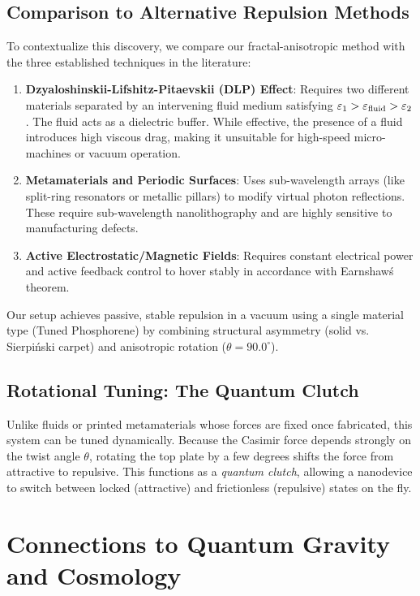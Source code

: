\documentclass[12pt,letterpaper]{article}
\begin{document}
\subsection{Comparison to Alternative Repulsion Methods}
To contextualize this discovery, we compare our fractal-anisotropic method with the three established techniques in the literature:
\begin{enumerate}
    \item \textbf{Dzyaloshinskii-Lifshitz-Pitaevskii (DLP) Effect}: Requires two different materials separated by an intervening fluid medium satisfying $\varepsilon_1 > \varepsilon_{\rm fluid} > \varepsilon_2$. The fluid acts as a dielectric buffer. While effective, the presence of a fluid introduces high viscous drag, making it unsuitable for high-speed micro-machines or vacuum operation.
    \item \textbf{Metamaterials and Periodic Surfaces}: Uses sub-wavelength arrays (like split-ring resonators or metallic pillars) to modify virtual photon reflections. These require sub-wavelength nanolithography and are highly sensitive to manufacturing defects.
    \item \textbf{Active Electrostatic/Magnetic Fields}: Requires constant electrical power and active feedback control to hover stably in accordance with Earnshaw\'s theorem.
\end{enumerate}
Our setup achieves passive, stable repulsion in a vacuum using a single material type (Tuned Phosphorene) by combining structural asymmetry (solid vs. Sierpi\'nski carpet) and anisotropic rotation ($\theta = 90.0^\circ$).

\subsection{Rotational Tuning: The Quantum Clutch}
Unlike fluids or printed metamaterials whose forces are fixed once fabricated, this system can be tuned dynamically. Because the Casimir force depends strongly on the twist angle $\theta$, rotating the top plate by a few degrees shifts the force from attractive to repulsive. This functions as a \emph{quantum clutch}, allowing a nanodevice to switch between locked (attractive) and frictionless (repulsive) states on the fly.


\section{Connections to Quantum Gravity and Cosmology}
\label{sec:quantum_gravity}
\end{document}
